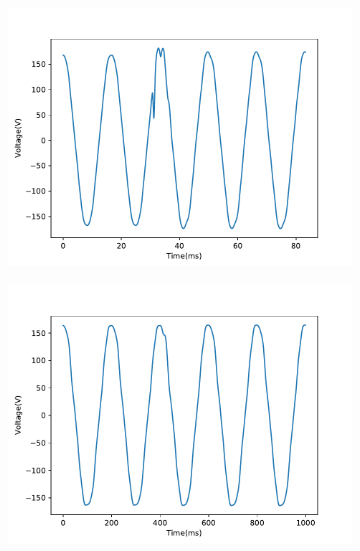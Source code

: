 \begin{figure}[ht!]
    \centering
    \begin{subfigure}{0.49\textwidth}
        \centering
        \includegraphics[width=1\linewidth]{img/napali_eval/raw_gridwide_sub_full1.pdf}
        \caption{}
        \label{fig:expdes:9:1}
    \end{subfigure}%
    \begin{subfigure}{0.49\textwidth}
        \centering
        \includegraphics[width=1\linewidth]{img/napali_eval/raw_gridwide_sub_full2.pdf}
        \caption{}
        \label{fig:expdes:9:2}
    \end{subfigure}


\end{figure}
